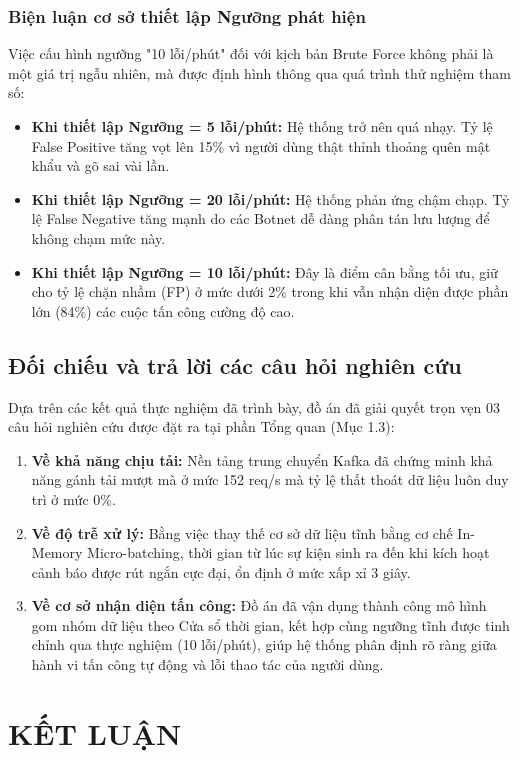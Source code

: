 \documentclass[12pt,a4paper]{report}
\begin{document}
\subsection{Biện luận cơ sở thiết lập Ngưỡng phát hiện}
Việc cấu hình ngưỡng "10 lỗi/phút" đối với kịch bản Brute Force không phải là một giá trị ngẫu nhiên, mà được định hình thông qua quá trình thử nghiệm tham số:
\begin{itemize}
    \item \textbf{Khi thiết lập Ngưỡng = 5 lỗi/phút:} Hệ thống trở nên quá nhạy. Tỷ lệ False Positive tăng vọt lên 15\% vì người dùng thật thỉnh thoảng quên mật khẩu và gõ sai vài lần.
    \item \textbf{Khi thiết lập Ngưỡng = 20 lỗi/phút:} Hệ thống phản ứng chậm chạp. Tỷ lệ False Negative tăng mạnh do các Botnet dễ dàng phân tán lưu lượng để không chạm mức này.
    \item \textbf{Khi thiết lập Ngưỡng = 10 lỗi/phút:} Đây là điểm cân bằng tối ưu, giữ cho tỷ lệ chặn nhầm (FP) ở mức dưới 2\% trong khi vẫn nhận diện được phần lớn (84\%) các cuộc tấn công cường độ cao.
\end{itemize}

\section{Đối chiếu và trả lời các câu hỏi nghiên cứu}
Dựa trên các kết quả thực nghiệm đã trình bày, đồ án đã giải quyết trọn vẹn 03 câu hỏi nghiên cứu được đặt ra tại phần Tổng quan (Mục 1.3):
\begin{enumerate}
    \item \textbf{Về khả năng chịu tải:} Nền tảng trung chuyển Kafka đã chứng minh khả năng gánh tải mượt mà ở mức 152 req/s mà tỷ lệ thất thoát dữ liệu luôn duy trì ở mức 0\%.
    \item \textbf{Về độ trễ xử lý:} Bằng việc thay thế cơ sở dữ liệu tĩnh bằng cơ chế In-Memory Micro-batching, thời gian từ lúc sự kiện sinh ra đến khi kích hoạt cảnh báo được rút ngắn cực đại, ổn định ở mức xấp xỉ 3 giây.
    \item \textbf{Về cơ sở nhận diện tấn công:} Đồ án đã vận dụng thành công mô hình gom nhóm dữ liệu theo Cửa sổ thời gian, kết hợp cùng ngưỡng tĩnh được tinh chỉnh qua thực nghiệm (10 lỗi/phút), giúp hệ thống phân định rõ ràng giữa hành vi tấn công tự động và lỗi thao tác của người dùng.
\end{enumerate}

\chapter*{KẾT LUẬN}
\end{document}
